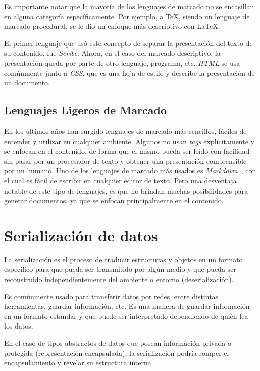 \documentclass[12pt,letterpaper,titlepage,oneside,openright]{book}
\newcommand{\latex}{\LaTeX\xspace}
\newcommand{\tex}{\TeX\xspace}
\begin{document}
\vfill

Es importante notar que la mayoría de los lenguajes de marcado no se encasillan en alguna categoría específicamente. Por ejemplo, a \tex, siendo un lenguaje de marcado procedural, se le dio un enfoque más descriptivo con \latex.


El primer lenguaje que usó este concepto de separar la presentación del texto de su contenido, fue \textit{Scribe}. Ahora, en el caso del marcado descriptivo, la presentación queda por parte de otro lenguaje, programa, etc. \textit{HTML} se usa comúnmente junto a \textit{CSS}, que es una hoja de estilo y describe la presentación de un documento.

\subsection{Lenguajes Ligeros de Marcado}

En los últimos años han surgido lenguajes de marcado más sencillos, fáciles de entender y utilizar en cualquier ambiente.  Algunos no usan \textit{tags} explícitamente y se enfocan en el contenido, de forma que el mismo pueda ser leído con facilidad sin pasar por un procesador de texto y obtener una presentación comprensible por un humano. Uno de los lenguajes de marcado más usados es \textit{Markdown}~\cite{webmarkdownhp}, con el cual es fácil de escribir en cualquier editor de texto. Pero una desventaja notable de este tipo de lenguajes, es que no brindan muchas posibilidades para generar documentos, ya que se enfocan principalmente en el contenido.

\section{Serialización de datos}

La serialización es el proceso de traducir estructuras y objetos en un formato específico para que pueda ser transmitido por algún medio y que pueda ser reconstruido independientemente del ambiente o entorno (deserialización).

Es comúnmente usado para transferir datos por redes, entre distintas herramientas, guardar información, etc. Es una manera de guardar información en un formato estándar y que puede ser interpretado dependiendo de quién lea los datos.

En el caso de tipos abstractos de datos que posean información privada o protegida (representación encapsulada), la serialización podría romper el encapsulamiento y revelar su estructura interna.
\end{document}
